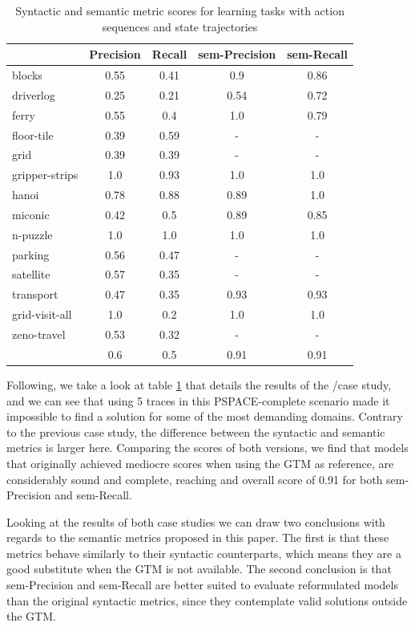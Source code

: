 \begin{table}[hbt!]
	\begin{center}		
		\begin{tabular}{l|c|c|c|c|}		
			& {\bf Precision} & {\bf Recall} & {\bf sem-Precision} & {\bf sem-Recall} \\
			\hline
			blocks & 0.55 & 0.41 & 0.9 & 0.86 \\
			driverlog & 0.25 & 0.21 & 0.54 & 0.72 \\
			ferry & 0.55 & 0.4 & 1.0 & 0.79 \\
			floor-tile & 0.39 & 0.59 & - & - \\
			grid & 0.39 & 0.39 & - & - \\
			gripper-strips & 1.0 & 0.93 & 1.0 & 1.0 \\
			hanoi & 0.78 & 0.88 & 0.89 & 1.0 \\
			miconic & 0.42 & 0.5 & 0.89 & 0.85 \\
			n-puzzle & 1.0 & 1.0 & 1.0 & 1.0 \\
			parking & 0.56 & 0.47 & - & - \\
			satellite & 0.57 & 0.35 & - & - \\
			transport & 0.47 & 0.35 & 0.93 & 0.93 \\
			grid-visit-all & 1.0 & 0.2 & 1.0 & 1.0 \\
			zeno-travel & 0.53 & 0.32 & - & - \\
			\hline
			& 0.6 & 0.5 & 0.91 & 0.91
		\end{tabular}
	\end{center}
	\caption{\small Syntactic and semantic metric scores for learning tasks with \NO action sequences and \NO state trajectories}
	\label{tab:metric_comparison_0_0}
\end{table}

Following, we take a look at table \ref{tab:metric_comparison_0_0} that details the results of the \NO/\NO case study, and we can see that using 5 traces in this PSPACE-complete scenario made it impossible to find a solution for some of the most demanding domains. Contrary to the previous case study, the difference between the syntactic and semantic metrics is larger here. Comparing the scores of both versions, we find that models that originally achieved mediocre scores when using the GTM as reference, are considerably sound and complete, reaching and overall score of 0.91 for both sem-Precision and sem-Recall.

Looking at the results of both case studies we can draw two conclusions with regards to the semantic metrics proposed in this paper. The first is that these metrics behave similarly to their syntactic counterparts, which means they are a good substitute when the GTM is not available. The second conclusion is that sem-Precision and sem-Recall are better suited to evaluate reformulated models than the original syntactic metrics, since they contemplate valid solutions outside the GTM.

